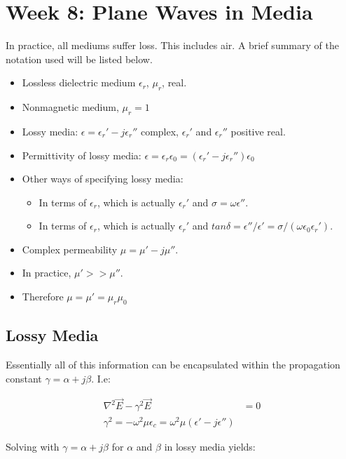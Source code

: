 \documentclass{book}
\begin{document}
\section{Week 8: Plane Waves in Media}

In practice, all mediums suffer loss. This includes air. A brief summary of the notation used will be listed below.

\begin{itemize}
	\item Lossless dielectric medium $\epsilon_r$, $\mu_r$, real.
	\item Nonmagnetic medium, $\mu_r=1$
	\item Lossy media: $\epsilon= \epsilon_r' - j\epsilon_r ''$ complex, $\epsilon_r '$ and $\epsilon_r ''$ positive real.
	\item Permittivity of lossy media: $\epsilon = \epsilon_r \epsilon_0 = (\epsilon_r' - j\epsilon_r '') \epsilon_0$
	\item Other ways of specifying lossy media:
	\begin{itemize}
		\item In terms of $\epsilon_r$, which is actually $\epsilon_r'$ and $\sigma = \omega \epsilon''$.
		\item In terms of $\epsilon_r$, which is actually $\epsilon_r'$ and $tan\delta=\epsilon''/\epsilon'=\sigma/(\omega \epsilon_0 \epsilon_r ')$.
	\end{itemize} 
	\item Complex permeability $\mu=\mu'-j\mu''$.
	\item In practice, $\mu ' >> \mu ''$.
	\item Therefore $\mu = \mu ' = \mu_r \mu_0$
\end{itemize}


\subsection{Lossy Media}
Essentially all of this information can be encapsulated within the propagation constant $\gamma = \alpha + j \beta$. I.e:

\begin{align*}
	\nabla^2 \vec{E} - \gamma^2 \vec{E} &= 0 \\
	\gamma^2 = -\omega^2 \mu \epsilon_c = \omega^2 \mu (\epsilon' - j\epsilon'')
\end{align*}

Solving with $\gamma = \alpha + j \beta$ for $\alpha$ and $\beta$ in lossy media yields:
\end{document}
